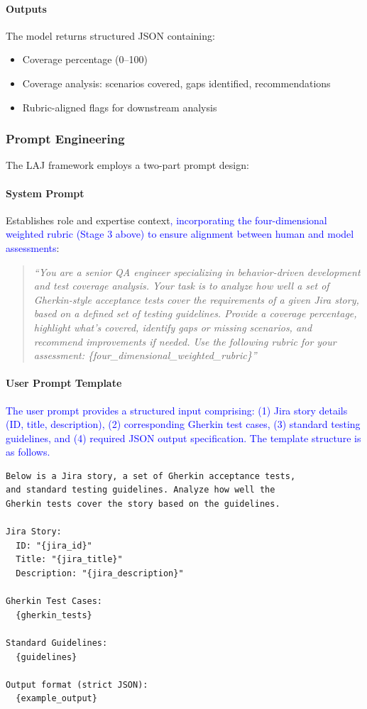 \documentclass[letterpaper]{article} %
\newcommand{\add}[1]{\textcolor{blue}{#1}}
\newcommand{\add}[1]{#1}
\begin{document}
\paragraph{Outputs}
The model returns structured JSON containing:
\begin{itemize}[nosep]
  \item Coverage percentage (0--100)
  \item Coverage analysis: scenarios covered, gaps identified, recommendations
  \item Rubric-aligned flags for downstream analysis
\end{itemize}

\subsubsection{Prompt Engineering}

The LAJ framework employs a two-part prompt design:

\paragraph{System Prompt} Establishes role and expertise context\add{, incorporating the four-dimensional weighted rubric 
(Stage 3 above) to ensure alignment between human and model assessments}:
\begin{quote}
\small
\textit{``You are a senior QA engineer specializing in behavior-driven development and test coverage analysis. Your task is to analyze how well a set of Gherkin-style acceptance tests cover the requirements of a given Jira story, based on a defined set of testing guidelines. Provide a coverage percentage, highlight what's covered, identify gaps or missing scenarios, and recommend improvements if needed. Use the following rubric for your assessment:
  \{four\_dimensional\_weighted\_rubric\}''}
\end{quote}

\paragraph{User Prompt Template} 
\add{The user prompt provides a structured input comprising: (1) Jira story details (ID, title, description), (2) corresponding Gherkin test cases, (3) standard testing guidelines, and (4) required JSON output specification. The template structure is as follows. }%

\begin{verbatim}
Below is a Jira story, a set of Gherkin acceptance tests, 
and standard testing guidelines. Analyze how well the 
Gherkin tests cover the story based on the guidelines.

Jira Story:
  ID: "{jira_id}"
  Title: "{jira_title}"
  Description: "{jira_description}"

Gherkin Test Cases:
  {gherkin_tests}

Standard Guidelines:
  {guidelines}

Output format (strict JSON):
  {example_output}
\end{verbatim}
\end{document}
